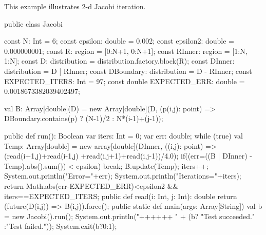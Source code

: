 
This example illustrates 2-d Jacobi iteration.

\begin{xten}
public class Jacobi {
   const N: Int = 6;
   const epsilon: double = 0.002;
   const epsilon2: double = 0.000000001;
   const R: region = [0:N+1, 0:N+1];
   const RInner: region = [1:N, 1:N];
   const D: distribution = distribution.factory.block(R);
   const DInner: distribution = D | RInner;
   const DBoundary: distribution = D - RInner;
   const EXPECTED_ITERS: Int  = 97;
   const double EXPECTED_ERR: double = 0.0018673382039402497;
     
   val B: Array[double](D) = new Array[double](D,
        (p(i,j): point) => DBoundary.contains(p) ? (N-1)/2 : N*(i-1)+(j-1));
    
   public def run(): Boolean {
      var iters: Int = 0;
      var err: double;
      while (true) {
        val Temp: Array[double] = 
           new array[double](DInner, ((i,j): point) =>
             (read(i+1,j)+read(i-1,j) +read(i,j+1)+read(i,j-1))/4.0);
        if((err=((B | DInner) - Temp).abs().sum()) < epsilon)
           break; 
        B.update(Temp);
        iters++; 
      }
      System.out.println("Error="+err);
      System.out.println("Iterations="+iters);
      return Math.abs(err-EXPECTED_ERR)<epsilon2 
          && iters==EXPECTED_ITERS;
   }
   public def read(i: Int, j: Int): double {
      return (future(D(i,j)) => B(i,j)).force();
   }
   public static def main(args: Array[String]) {
      val b = new Jacobi().run();
      System.out.println("++++++ "
                         + (b? "Test succeeded."
                             :"Test failed."));
      System.exit(b?0:1);
   }
}
\end{xten}
